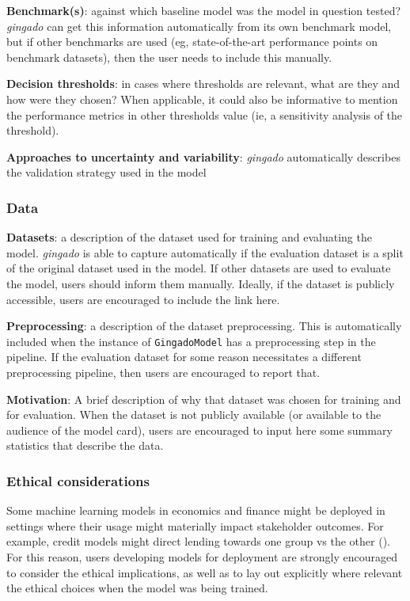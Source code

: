 \documentclass{article}
\begin{document}
\textbf{Benchmark(s)}: against which baseline model was the model in question tested? \textit{gingado} can get this information automatically from its own benchmark model, but if other benchmarks are used (eg, state-of-the-art performance points on benchmark datasets), then the user needs to include this manually.

\textbf{Decision thresholds}: in cases where thresholds are relevant, what are they and how were they chosen? When applicable, it could also be informative to mention the performance metrics in other thresholds value (ie, a sensitivity analysis of the threshold).

\textbf{Approaches to uncertainty and variability}: \textit{gingado} automatically describes the validation strategy used in the model

\subsubsection{Data}

\textbf{Datasets}: a description of the dataset used for training and evaluating the model. \textit{gingado} is able to capture automatically if the evaluation dataset is a split of the original dataset used in the model. If other datasets are used to evaluate the model, users should inform them manually. Ideally, if the dataset is publicly accessible, users are encouraged to include the link here.

\textbf{Preprocessing}: a description of the dataset preprocessing. This is automatically included when the instance of \texttt{GingadoModel} has a preprocessing step in the pipeline. If the evaluation dataset for some reason necessitates a different preprocessing pipeline, then users are encouraged to report that.

\textbf{Motivation}: A brief description of why that dataset was chosen for training and for evaluation. When the dataset is not publicly available (or available to the audience of the model card), users are encouraged to input here some summary statistics that describe the data.

\subsubsection{Ethical considerations}

Some machine learning models in economics and finance might be deployed in settings where their usage might materially impact stakeholder outcomes. For example, credit models might direct lending towards one group vs the other (\cite{predunequal}). For this reason, users developing models for deployment are strongly encouraged to consider the ethical implications, as well as to lay out explicitly where relevant the ethical choices when the model was being trained.
\end{document}
